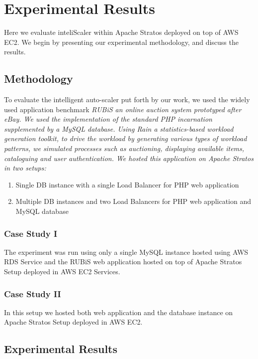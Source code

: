 \section{Experimental Results}
Here we evaluate inteliScaler within Apache Stratos deployed on top of AWS EC2. We begin by presenting our experimental methodology, and discuss the results. \\

\subsection{Methodology}
To evaluate the intelligent auto-scaler put forth by our work, we used the widely used application benchmark \em{RUBiS} an online auction system prototyped after eBay. We used the implementation of the standard PHP incarnation supplemented by a MySQL database. Using \em{Rain} a statistics-based workload generation toolkit, to drive the workload by generating various types of workload patterns, we simulated processes such as auctioning, displaying available items, cataloguing and user authentication. We hosted this application on Apache Stratos in two setups:\\

\begin{enumerate}
\item Single DB instance with a single Load Balancer for PHP web application

\item Multiple DB instances and two Load Balancers for PHP web application and MySQL database

\end{enumerate}

\subsubsection{Case Study I}
The experiment was run using only a single MySQL instance hosted using AWS RDS Service and the RUBiS web application hosted on top of Apache Stratos Setup deployed in AWS EC2 Services. \\

\subsubsection{Case Study II}
In this setup we hosted both web application and the database instance on Apache Stratos Setup deployed in AWS EC2.

\subsection{Experimental Results}